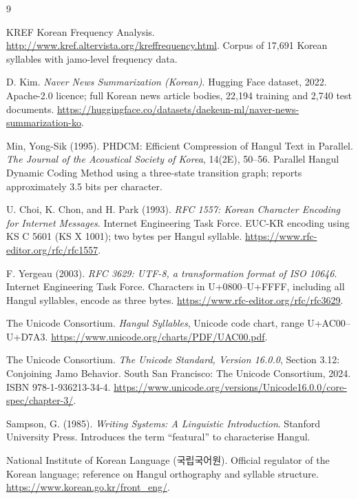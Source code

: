 \documentclass[conference]{IEEEtran}
\begin{document}
\begin{thebibliography}{9}

KREF Korean Frequency Analysis.
\url{http://www.kref.altervista.org/kreffrequency.html}.
Corpus of 17,691 Korean syllables with jamo-level frequency data.

D. Kim.
\emph{Naver News Summarization (Korean)}. Hugging Face dataset, 2022.
Apache-2.0 licence; full Korean news article bodies, 22{,}194 training and
2{,}740 test documents.
\url{https://huggingface.co/datasets/daekeun-ml/naver-news-summarization-ko}.

Min, Yong-Sik (1995).
PHDCM: Efficient Compression of Hangul Text in Parallel.
\emph{The Journal of the Acoustical Society of Korea}, 14(2E), 50--56.
Parallel Hangul Dynamic Coding Method using a three-state transition graph;
reports approximately 3.5 bits per character.

U. Choi, K. Chon, and H. Park (1993).
\emph{RFC 1557: Korean Character Encoding for Internet Messages}.
Internet Engineering Task Force.
EUC-KR encoding using KS C 5601 (KS X 1001); two bytes per Hangul syllable.
\url{https://www.rfc-editor.org/rfc/rfc1557}.

F. Yergeau (2003).
\emph{RFC 3629: UTF-8, a transformation format of ISO 10646}.
Internet Engineering Task Force.
Characters in U+0800--U+FFFF, including all Hangul syllables, encode as three bytes.
\url{https://www.rfc-editor.org/rfc/rfc3629}.

The Unicode Consortium.
\emph{Hangul Syllables}, Unicode code chart, range U+AC00--U+D7A3.
\url{https://www.unicode.org/charts/PDF/UAC00.pdf}.

The Unicode Consortium.
\emph{The Unicode Standard, Version 16.0.0}, Section 3.12: Conjoining Jamo Behavior.
South San Francisco: The Unicode Consortium, 2024. ISBN 978-1-936213-34-4.
\url{https://www.unicode.org/versions/Unicode16.0.0/core-spec/chapter-3/}.

Sampson, G. (1985).
\emph{Writing Systems: A Linguistic Introduction}.
Stanford University Press.
Introduces the term ``featural'' to characterise Hangul.

National Institute of Korean Language (국립국어원).
Official regulator of the Korean language; reference on Hangul orthography and syllable structure.
\url{https://www.korean.go.kr/front_eng/}.


\end{thebibliography}
\end{document}
